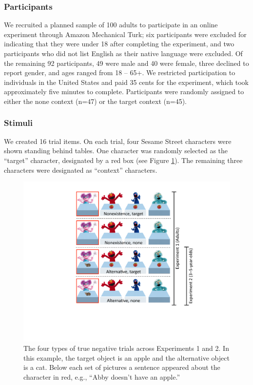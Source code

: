 \documentclass[man, noapacite]{apa2}
\begin{document}
\subsubsection{Participants}

We recruited a planned sample of 100 adults to participate in an online experiment through Amazon Mechanical Turk; six participants were excluded for indicating that they were under 18 after completing the experiment, and two participants who did not list English as their native language were excluded. Of the remaining 92 participants, 49 were male and 40 were female, three declined to report gender, and ages ranged from 18 -- 65+. We restricted participation to individuals in the United States and paid 35 cents for the experiment, which took approximately five minutes to complete. Participants were randomly assigned to either the none context (n=47) or the target context (n=45).

\subsubsection{Stimuli}

We created 16 trial items. On each trial, four Sesame Street characters were shown standing behind tables. One character was randomly selected as the ``target'' character, designated by a red box (see Figure \ref{fig:trial}). The remaining three characters were designated as ``context'' characters.


\begin{figure}[t]
\begin{center}
\includegraphics[width=4.5in]{figures/trialtypes.pdf}
\caption{\label{fig:trial} The four types of true negative trials across Experiments 1 and 2. In this example, the target object is an apple and the alternative object is a cat. Below each set of pictures a sentence appeared about the character in red, e.g., ``Abby doesn't have an apple.'' }
\end{center}
\end{figure}
\end{document}
